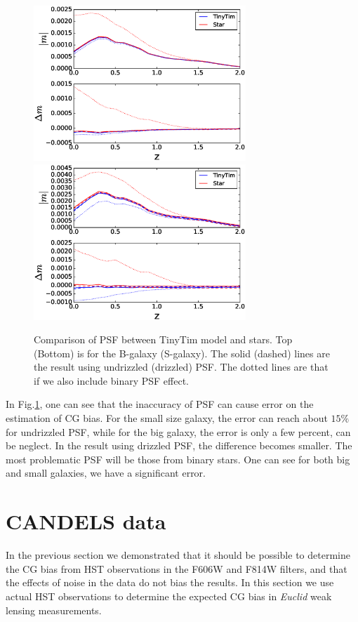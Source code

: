 \documentclass[useAMS,usenatbib]{mnras}
\begin{document}
%



%
\begin{figure}
\includegraphics[width=8.0cm]{ztinytim_b.eps}
\includegraphics[width=8.0cm]{ztinytim_s.eps}
\caption{Comparison of PSF between TinyTim model and stars.
  Top (Bottom) is for the B-galaxy (S-galaxy). The solid (dashed) 
  lines are the result using undrizzled (drizzled) PSF. 
  The dotted lines are that if we also include binary PSF effect.}
\label{fig:psfacc2}
\end{figure}
%
In Fig.\ref{fig:psfacc2}, one can see that the inaccuracy of PSF can
cause error on the estimation of CG bias. For the small size galaxy,
the error can reach about $15\%$ for undrizzled PSF, while for the big
galaxy, the error is only a few percent, can be neglect. In the result
using drizzled PSF, the difference becomes smaller. The most
problematic PSF will be those from binary stars. One can see for both
big and small galaxies, we have a significant error.

\section{CANDELS data}
\label{sec:candels}

In the previous section we demonstrated that it should be possible to 
determine the CG bias from HST observations in the F606W and F814W
filters, and that the effects of noise in the data do not bias the results.
In this section we use actual HST observations to determine the expected CG bias 
in {\it Euclid} weak lensing measurements. 
\end{document}
